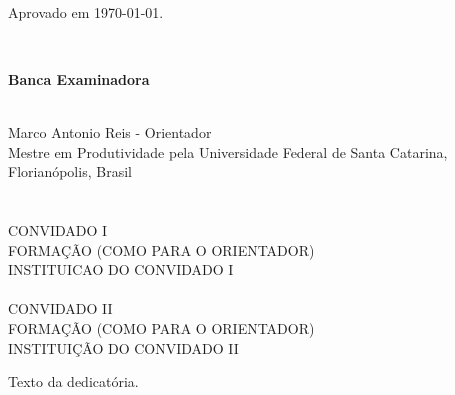 \documentclass[12pt,oneside,a4paper, chapter=TITLE, section = TITLE, english, brazil]{abntex2}
\begin{document}
\begin{folhadeaprovacao}

% 

\begin{center}
	\imprimirautor
	\vfill
	\imprimirtitulo
\end{center}
\vfill
\imprimirpreambulo \\
\begin{flushright}
	Aprovado em \today .
\end{flushright}
\ \\
\begin{center}
	\textbf{Banca Examinadora}	\\ \ \\
\end{center}
	Marco Antonio Reis - Orientador \hrulefill
	\\
	Mestre em Produtividade pela Universidade Federal de Santa Catarina, Florianópolis, Brasil \\
	\imprimirinstituicao \\ \ \\
	CONVIDADO I \hrulefill \\
	FORMAÇÃO (COMO PARA O ORIENTADOR) \\
	INSTITUICAO DO CONVIDADO I \\ \ \\
	CONVIDADO II \hrulefill \\
	FORMAÇÃO (COMO PARA O ORIENTADOR) \\
	INSTITUIÇÃO DO CONVIDADO II	
	\vfill
\begin{center}	
	\imprimirdata
\end{center}
\newpage
\end{folhadeaprovacao}


\begin{dedicatoria}
\vfill 
\vspace*{\fill}
\noindent
\begin{flushright}
	Texto da dedicatória.
\end{flushright}
\newpage 
\end{dedicatoria}

\end{document}
